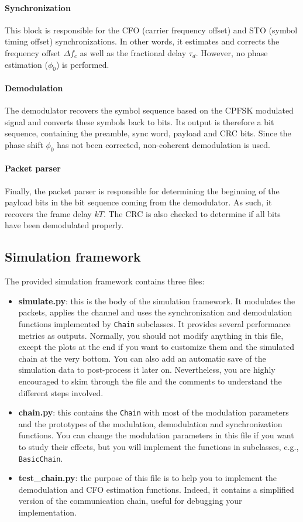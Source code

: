 \paragraph{Synchronization}
This block is responsible for the CFO (carrier frequency offset) and STO (symbol timing offset) synchronizations. In other words, it estimates and corrects the frequency offset $\Delta f_c$ as well as the fractional delay $\tau_d$. However, no phase estimation ($\phi_0$) is performed.


\paragraph{Demodulation}
The demodulator recovers the symbol sequence based on the CPFSK modulated signal and converts these symbols back to bits. Its output is therefore a bit sequence, containing the preamble, sync word, payload and CRC bits. Since the phase shift $\phi_0$ has not been corrected, non-coherent demodulation is used.

\paragraph{Packet parser}
Finally, the packet parser is responsible for determining the beginning of the payload bits in the bit sequence coming from the demodulator. As such, it recovers the frame delay $kT$. The CRC is also checked to determine if all bits have been demodulated properly.

\subsection{Simulation framework}
The provided simulation framework contains three files:
\begin{itemize}
    \item \textbf{simulate.py}: this is the body of the simulation framework. It modulates the packets, applies the channel and uses the synchronization and demodulation functions implemented by \texttt{Chain} subclasses. It provides several performance metrics as outputs. Normally, you should not modify anything in this file, except the plots at the end if you want to customize them and the simulated chain at the very bottom. You can also add an automatic save of the simulation data to post-process it later on. Nevertheless, you are highly encouraged to skim through the file and the comments to understand the different steps involved.
    \item \textbf{chain.py}: this contains the \texttt{Chain} with most of the modulation parameters and the prototypes of the modulation, demodulation and synchronization functions. You can change the modulation parameters in this file if you want to study their effects, but you will implement the functions in subclasses, e.g., \texttt{BasicChain}.
    \item \textbf{test\_chain.py}: the purpose of this file is to help you to implement the demodulation and CFO estimation functions. Indeed, it contains a simplified version of the communication chain, useful for debugging your implementation.
\end{itemize}

